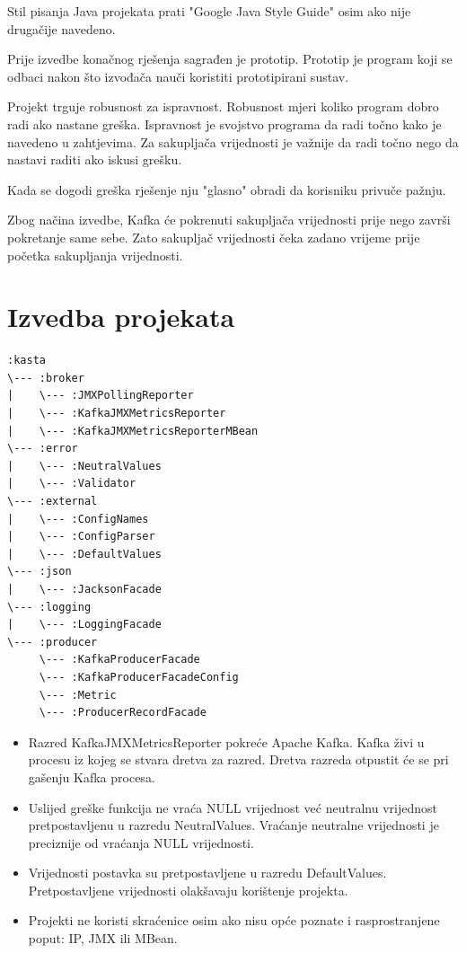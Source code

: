 \documentclass[utf8, diplomski, lmodern, numeric]{fer}
\begin{document}
Stil pisanja Java projekata prati "Google Java Style Guide" osim ako nije drugačije navedeno.

Prije izvedbe konačnog rješenja sagrađen je prototip. Prototip je program koji se odbaci nakon što izvođača nauči koristiti prototipirani sustav.

Projekt trguje robusnost za ispravnost. Robusnost mjeri koliko program dobro radi ako nastane greška. Ispravnost je svojstvo programa da radi točno kako je navedeno u zahtjevima. Za sakupljača vrijednosti je važnije da radi točno nego da nastavi raditi ako iskusi grešku.

Kada se dogodi greška rješenje nju "glasno" obradi da korisniku privuče pažnju. 

Zbog načina izvedbe, Kafka će pokrenuti sakupljača vrijednosti prije nego završi pokretanje same sebe. Zato sakupljač vrijednosti čeka zadano vrijeme prije početka sakupljanja vrijednosti.


\section{Izvedba projekata}

\begin{lstlisting}[floatplacement=H]
:kasta
\--- :broker
|    \--- :JMXPollingReporter
|    \--- :KafkaJMXMetricsReporter
|    \--- :KafkaJMXMetricsReporterMBean
\--- :error
|    \--- :NeutralValues
|    \--- :Validator
\--- :external
|    \--- :ConfigNames
|    \--- :ConfigParser
|    \--- :DefaultValues
\--- :json
|    \--- :JacksonFacade
\--- :logging
|    \--- :LoggingFacade
\--- :producer
     \--- :KafkaProducerFacade
     \--- :KafkaProducerFacadeConfig
     \--- :Metric
     \--- :ProducerRecordFacade
\end{lstlisting}

\begin{itemize}
    \item Razred KafkaJMXMetricsReporter pokreće Apache Kafka. Kafka živi u procesu iz kojeg se stvara dretva za razred. Dretva razreda otpustit će se pri gašenju Kafka procesa.
    \item Uslijed greške funkcija ne vraća NULL vrijednost već neutralnu vrijednost pretpostavljenu u razredu NeutralValues. Vraćanje neutralne vrijednosti je preciznije od vraćanja NULL vrijednosti.
    \item Vrijednosti postavka su pretpostavljene u razredu DefaultValues. Pretpostavljene vrijednosti olakšavaju korištenje projekta.
    \item Projekti ne koristi skraćenice osim ako nisu opće poznate i rasprostranjene poput: IP, JMX ili MBean.
\end{itemize}
\end{document}
